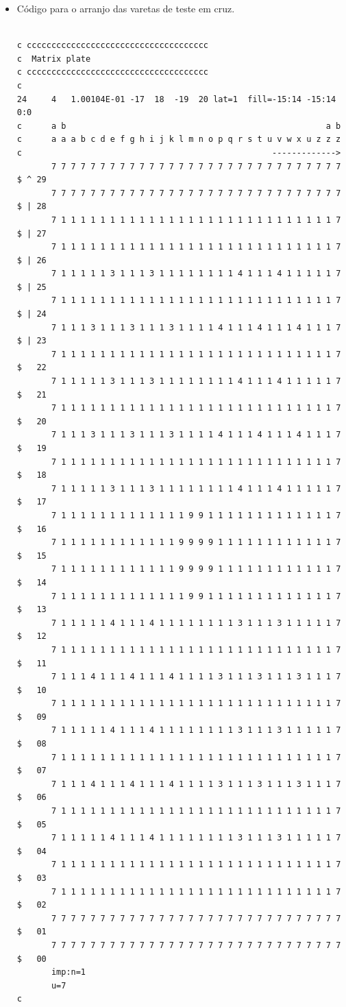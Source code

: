 \documentclass[
	12pt,				%
	openany,			%
	twoside,			%
	a4paper,			%
	english,			%
	french,				%
	spanish,			%
	brazil				%
	]{abntex2}
\begin{document}
\begin{anexosenv}
\begin{itemize}
\begin{lstlisting}
\end{lstlisting}

\newpage
\item Código para o arranjo das varetas de teste em cruz.
\begin{lstlisting}

c ccccccccccccccccccccccccccccccccccccc
c  Matrix plate  
c ccccccccccccccccccccccccccccccccccccc
c
24     4   1.00104E-01 -17  18  -19  20 lat=1  fill=-15:14 -15:14 0:0 
c      a b                                                     a b    
c      a a a b c d e f g h i j k l m n o p q r s t u v w x u z z z
c                                                   -------------> 
       7 7 7 7 7 7 7 7 7 7 7 7 7 7 7 7 7 7 7 7 7 7 7 7 7 7 7 7 7 7  $ ^ 29    
       7 7 7 7 7 7 7 7 7 7 7 7 7 7 7 7 7 7 7 7 7 7 7 7 7 7 7 7 7 7  $ | 28    
       7 1 1 1 1 1 1 1 1 1 1 1 1 1 1 1 1 1 1 1 1 1 1 1 1 1 1 1 1 7  $ | 27    
       7 1 1 1 1 1 1 1 1 1 1 1 1 1 1 1 1 1 1 1 1 1 1 1 1 1 1 1 1 7  $ | 26    
       7 1 1 1 1 1 3 1 1 1 3 1 1 1 1 1 1 1 1 4 1 1 1 4 1 1 1 1 1 7  $ | 25    
       7 1 1 1 1 1 1 1 1 1 1 1 1 1 1 1 1 1 1 1 1 1 1 1 1 1 1 1 1 7  $ | 24    
       7 1 1 1 3 1 1 1 3 1 1 1 3 1 1 1 1 4 1 1 1 4 1 1 1 4 1 1 1 7  $ | 23    
       7 1 1 1 1 1 1 1 1 1 1 1 1 1 1 1 1 1 1 1 1 1 1 1 1 1 1 1 1 7  $   22    
       7 1 1 1 1 1 3 1 1 1 3 1 1 1 1 1 1 1 1 4 1 1 1 4 1 1 1 1 1 7  $   21    
       7 1 1 1 1 1 1 1 1 1 1 1 1 1 1 1 1 1 1 1 1 1 1 1 1 1 1 1 1 7  $   20    
       7 1 1 1 3 1 1 1 3 1 1 1 3 1 1 1 1 4 1 1 1 4 1 1 1 4 1 1 1 7  $   19    
       7 1 1 1 1 1 1 1 1 1 1 1 1 1 1 1 1 1 1 1 1 1 1 1 1 1 1 1 1 7  $   18    
       7 1 1 1 1 1 3 1 1 1 3 1 1 1 1 1 1 1 1 4 1 1 1 4 1 1 1 1 1 7  $   17    
       7 1 1 1 1 1 1 1 1 1 1 1 1 1 9 9 1 1 1 1 1 1 1 1 1 1 1 1 1 7  $   16    
       7 1 1 1 1 1 1 1 1 1 1 1 1 9 9 9 9 1 1 1 1 1 1 1 1 1 1 1 1 7  $   15    
       7 1 1 1 1 1 1 1 1 1 1 1 1 9 9 9 9 1 1 1 1 1 1 1 1 1 1 1 1 7  $   14    
       7 1 1 1 1 1 1 1 1 1 1 1 1 1 9 9 1 1 1 1 1 1 1 1 1 1 1 1 1 7  $   13    
       7 1 1 1 1 1 4 1 1 1 4 1 1 1 1 1 1 1 1 3 1 1 1 3 1 1 1 1 1 7  $   12    
       7 1 1 1 1 1 1 1 1 1 1 1 1 1 1 1 1 1 1 1 1 1 1 1 1 1 1 1 1 7  $   11    
       7 1 1 1 4 1 1 1 4 1 1 1 4 1 1 1 1 3 1 1 1 3 1 1 1 3 1 1 1 7  $   10    
       7 1 1 1 1 1 1 1 1 1 1 1 1 1 1 1 1 1 1 1 1 1 1 1 1 1 1 1 1 7  $   09    
       7 1 1 1 1 1 4 1 1 1 4 1 1 1 1 1 1 1 1 3 1 1 1 3 1 1 1 1 1 7  $   08    
       7 1 1 1 1 1 1 1 1 1 1 1 1 1 1 1 1 1 1 1 1 1 1 1 1 1 1 1 1 7  $   07    
       7 1 1 1 4 1 1 1 4 1 1 1 4 1 1 1 1 3 1 1 1 3 1 1 1 3 1 1 1 7  $   06    
       7 1 1 1 1 1 1 1 1 1 1 1 1 1 1 1 1 1 1 1 1 1 1 1 1 1 1 1 1 7  $   05    
       7 1 1 1 1 1 4 1 1 1 4 1 1 1 1 1 1 1 1 3 1 1 1 3 1 1 1 1 1 7  $   04    
       7 1 1 1 1 1 1 1 1 1 1 1 1 1 1 1 1 1 1 1 1 1 1 1 1 1 1 1 1 7  $   03    
       7 1 1 1 1 1 1 1 1 1 1 1 1 1 1 1 1 1 1 1 1 1 1 1 1 1 1 1 1 7  $   02    
       7 7 7 7 7 7 7 7 7 7 7 7 7 7 7 7 7 7 7 7 7 7 7 7 7 7 7 7 7 7  $   01     
       7 7 7 7 7 7 7 7 7 7 7 7 7 7 7 7 7 7 7 7 7 7 7 7 7 7 7 7 7 7  $   00       
       imp:n=1
       u=7
c


\end{lstlisting}
\end{itemize}
\end{anexosenv}
\end{document}
